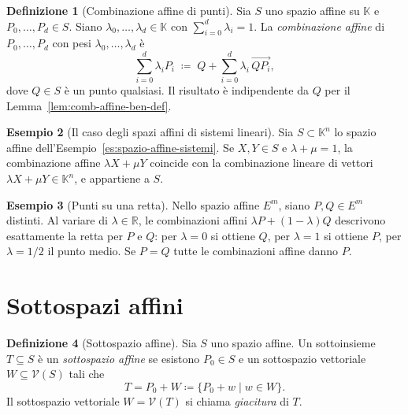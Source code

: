 \documentclass[11pt, a4paper]{book}
\theoremstyle{definition}
\newtheorem{definizione}{Definizione}[section]
\newtheorem{esempio}[definizione]{Esempio}
\theoremstyle{plain}
\theoremstyle{remark}
\newcommand{\R}{\mathbb{R}}
\newcommand{\K}{\mathbb{K}}
\newcommand{\VV}{\mathcal{V}}   %
\begin{document}
\begin{defbox}
\begin{definizione}[Combinazione affine di punti]
\label{def:comb-affine}
Sia $S$ uno spazio affine su $\K$ e $P_0, \ldots, P_d \in S$. Siano $\lambda_0, \ldots, \lambda_d \in \K$ con $\sum_{i=0}^d \lambda_i = 1$. La \emph{combinazione affine} di $P_0, \ldots, P_d$ con pesi $\lambda_0, \ldots, \lambda_d$ è
\[
  \sum_{i=0}^d \lambda_i P_i \;\coloneqq\; Q + \sum_{i=0}^d \lambda_i \,\overrightarrow{QP_i},
\]
dove $Q \in S$ è un punto qualsiasi. Il risultato è indipendente da $Q$ per il Lemma~\ref{lem:comb-affine-ben-def}.
\end{definizione}
\end{defbox}

\begin{exbox}
\begin{esempio}[Il caso degli spazi affini di sistemi lineari]
Sia $S \subset \K^n$ lo spazio affine dell'Esempio~\ref{es:spazio-affine-sistemi}. Se $X, Y \in S$ e $\lambda + \mu = 1$, la combinazione affine $\lambda X + \mu Y$ coincide con la combinazione lineare di vettori $\lambda X + \mu Y \in \K^n$, e appartiene a $S$.
\end{esempio}
\end{exbox}

\begin{exbox}
\begin{esempio}[Punti su una retta]
Nello spazio affine $E^m$, siano $P, Q \in E^m$ distinti. Al variare di $\lambda \in \R$, le combinazioni affini $\lambda P + (1-\lambda)Q$ descrivono esattamente la retta per $P$ e $Q$: per $\lambda = 0$ si ottiene $Q$, per $\lambda = 1$ si ottiene $P$, per $\lambda = 1/2$ il punto medio. Se $P = Q$ tutte le combinazioni affine danno $P$.
\end{esempio}
\end{exbox}

\section{Sottospazi affini}
\label{sec:sottospazi-affini}

\begin{defbox}
\begin{definizione}[Sottospazio affine]
\label{def:sottospazio-affine}
Sia $S$ uno spazio affine. Un sottoinsieme $T \subseteq S$ è un \emph{sottospazio affine} se esistono $P_0 \in S$ e un sottospazio vettoriale $W \subseteq \VV(S)$ tali che
\[
  T = P_0 + W \coloneqq \{ P_0 + w \mid w \in W \}.
\]
Il sottospazio vettoriale $W = \VV(T)$ si chiama \emph{giacitura} di $T$.
\end{definizione}
\end{defbox}
\end{document}
